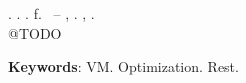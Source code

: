 \begin{resumo}[ABSTRACT]
\begin{SingleSpacing}

\imprimirautorcitacao. \imprimirtitleabstract. \imprimirdata. \pageref {LastPage} f. \imprimirprojeto\ – \imprimirprograma, \imprimirinstituicao. \imprimirlocal, \imprimirdata.\\

@TODO

\textbf{Keywords}: VM. Optimization. Rest. 

\end{SingleSpacing}
\end{resumo}
